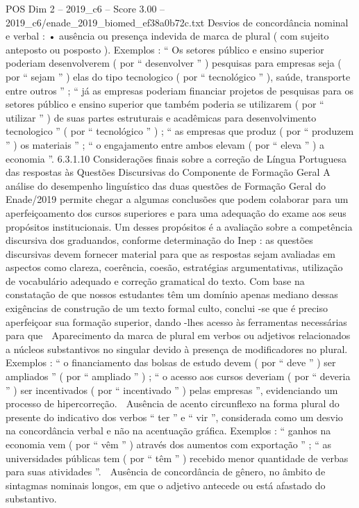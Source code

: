 \begin{textsample}{POS Dim 2 – 2019\_c6 – Score 3.00 – 2019\_c6/enade\_2019\_biomed\_ef38a0b72c.txt}
Desvios de concordância nominal e verbal : • ausência ou presença indevida de marca de plural ( com sujeito anteposto ou posposto ).
Exemplos : “ Os setores público e ensino superior poderiam desenvolverem ( por “ desenvolver ” ) pesquisas para empresas seja ( por “ sejam ” ) elas do tipo tecnologico ( por “ tecnológico ” ), saúde, transporte entre outros ” ; “ já as empresas poderiam financiar projetos de pesquisas para os setores público e ensino superior que também poderia se utilizarem ( por “ utilizar ” ) de suas partes estruturais e acadêmicas para desenvolvimento tecnologico ” ( por “ tecnológico ” ) ; “ as empresas que produz ( por “ produzem ” ) os materiais ” ; “ o engajamento entre ambos elevam ( por “ eleva ” ) a economia ”. 6.3.1.10 Considerações finais sobre a correção de Língua Portuguesa das respostas às Questões Discursivas do Componente de Formação Geral A análise do desempenho linguístico das duas questões de Formação Geral do Enade/2019 permite chegar a algumas conclusões que podem colaborar para um aperfeiçoamento dos cursos superiores e para uma adequação do exame aos seus propósitos institucionais.
Um desses propósitos é a avaliação sobre a competência discursiva dos graduandos, conforme determinação do Inep : as questões discursivas devem fornecer material para que as respostas sejam avaliadas em aspectos como clareza, coerência, coesão, estratégias argumentativas, utilização de vocabulário adequado e correção gramatical do texto.
Com base na constatação de que nossos estudantes têm um domínio apenas mediano dessas exigências de construção de um texto formal culto, conclui -se que é preciso aperfeiçoar sua formação superior, dando -lhes acesso às ferramentas necessárias para que  Aparecimento da marca de plural em verbos ou adjetivos relacionados a núcleos substantivos no singular devido à presença de modificadores no plural.
Exemplos : “ o financiamento das bolsas de estudo devem ( por “ deve ” ) ser ampliados ” ( por “ ampliado ” ) ; “ o acesso aos cursos deveriam ( por “ deveria ” ) ser incentivados ( por “ incentivado ” ) pelas empresas ”, evidenciando um processo de hipercorreção.  Ausência de acento circunflexo na forma plural do presente do indicativo dos verbos “ ter ” e “ vir ”, considerada como um desvio na concordância verbal e não na acentuação gráfica.
Exemplos : “ ganhos na economia vem ( por “ vêm ” ) através dos aumentos com exportação ” ; “ as universidades públicas tem ( por “ têm ” ) recebido menor quantidade de verbas para suas atividades ”.  Ausência de concordância de gênero, no âmbito de sintagmas nominais longos, em que o adjetivo antecede ou está afastado do substantivo.

\end{textsample}
